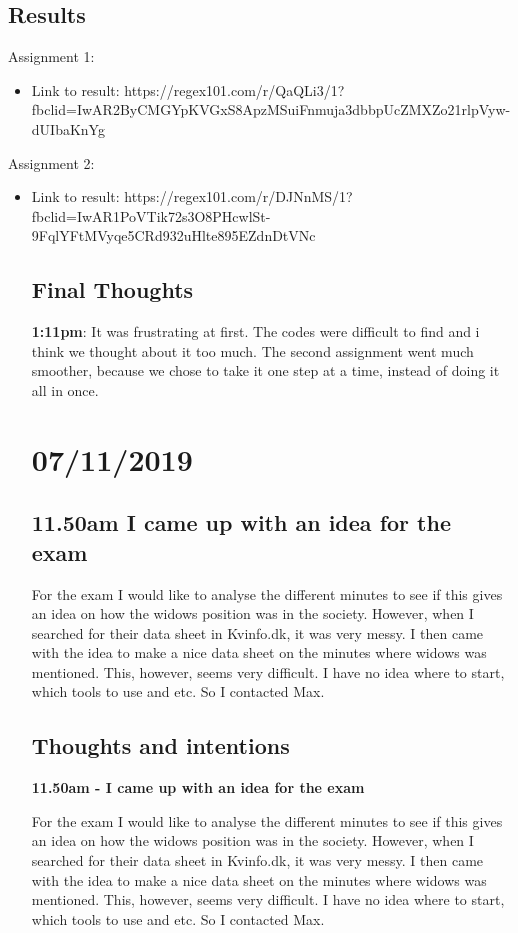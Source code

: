 \documentclass{article}
\begin{document}
\subsection{Results}
Assignment 1: 
\begin{itemize}
\item Link to result: https://regex101.com/r/QaQLi3/1?fbclid=IwAR2ByCMGYpKVGxS8ApzMSuiFnmuja3dbbpUcZMXZo21rlpVyw-dUIbaKnYg 
\end{itemize}
Assignment 2:
\begin{itemize}
\item Link to result: https://regex101.com/r/DJNnMS/1?fbclid=IwAR1PoVTik72s3O8PHcwlSt-9FqlYFtMVyqe5CRd932uHlte895EZdnDtVNc 
\subsection{Final Thoughts}

\textbf{1:11pm}: It was frustrating at first. The codes were difficult to find and i think we thought about it too much. The second assignment went much smoother, because we chose to take it one step at a time, instead of doing it all in once. 


\section{07/11/2019}

\subsection{11.50am I came up with an idea for the exam}

For the exam I would like to analyse the different minutes to see if this gives an idea on how the widows position was in the society. However, when I searched for their data sheet in Kvinfo.dk, it was very messy. I then came with the idea to make a nice data sheet on the minutes where widows was mentioned. This, however, seems very difficult. I have no idea where to start, which tools to use and etc. So I contacted Max. 

\subsection{Thoughts and intentions}

\textbf{11.50am - I came up with an idea for the exam}

For the exam I would like to analyse the different minutes to see if this gives an idea on how the widows position was in the society. However, when I searched for their data sheet in Kvinfo.dk, it was very messy. I then came with the idea to make a nice data sheet on the minutes where widows was mentioned. This, however, seems very difficult. I have no idea where to start, which tools to use and etc. So I contacted Max. 


\end{itemize}
\end{document}
